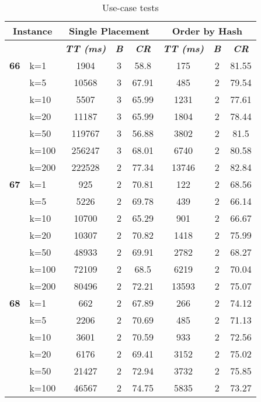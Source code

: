     \begin{table}[htbp]
    \caption{Use-case tests}
    \centering
    \begin{tabular}{|l|l|c|c|c|c|c|c|}
    
    \multicolumn{ 2}{|c|}{\textbf{Instance}} & \multicolumn{ 3}{c|}{\textbf{Single Placement}} & \multicolumn{ 3}{c|}{\textbf{Order by Hash}} \\ \hline
    \multicolumn{ 2}{|l|}{} & \textbf{\textit{TT (ms)}} & \textbf{\textit{B}} & \textbf{\textit{CR}} & \textbf{\textit{TT (ms)}} & \textbf{\textit{B}} & \textbf{\textit{CR}} \\ \hline
    \multicolumn{1}{|r|}{\textbf{66}} & k=1 & 1904 & 3 & 58.8 & 175 & 2 & 81.55 \\ 
     & k=5 & 10568 & 3 & 67.91 & 485 & 2 & 79.54 \\ 
     & k=10 & 5507 & 3 & 65.99 & 1231 & 2 & 77.61 \\ 
     & k=20 & 11187 & 3 & 65.99 & 1804 & 2 & 78.44 \\ 
     & k=50 & 119767 & 3 & 56.88 & 3802 & 2 & 81.5 \\ 
     & k=100 & 256247 & 3 & 68.01 & 6740 & 2 & 80.58 \\ 
     & k=200 & 222528 & 2 & 77.34 & 13746 & 2 & 82.84 \\ \hline
    \multicolumn{1}{|r|}{\textbf{67}} & k=1 & 925 & 2 & 70.81 & 122 & 2 & 68.56 \\ 
     & k=5 & 5226 & 2 & 69.78 & 439 & 2 & 66.14 \\ 
     & k=10 & 10700 & 2 & 65.29 & 901 & 2 & 66.67 \\ 
     & k=20 & 10307 & 2 & 70.82 & 1418 & 2 & 75.99 \\ 
     & k=50 & 48933 & 2 & 69.91 & 2782 & 2 & 68.27 \\ 
     & k=100 & 72109 & 2 & 68.5 & 6219 & 2 & 70.04 \\ 
     & k=200 & 80496 & 2 & 72.21 & 13593 & 2 & 75.07 \\ \hline
    \multicolumn{1}{|r|}{\textbf{68}} & k=1 & 662 & 2 & 67.89 & 266 & 2 & 74.12 \\ 
     & k=5 & 2206 & 2 & 70.69 & 485 & 2 & 71.13 \\ 
     & k=10 & 3601 & 2 & 70.59 & 933 & 2 & 72.56 \\ 
     & k=20 & 6176 & 2 & 69.41 & 3152 & 2 & 75.02 \\ 
     & k=50 & 21427 & 2 & 72.94 & 3732 & 2 & 75.85 \\ 
     & k=100 & 46567 & 2 & 74.75 & 5835 & 2 & 73.27 \\ 

\end{tabular}
\end{table}

